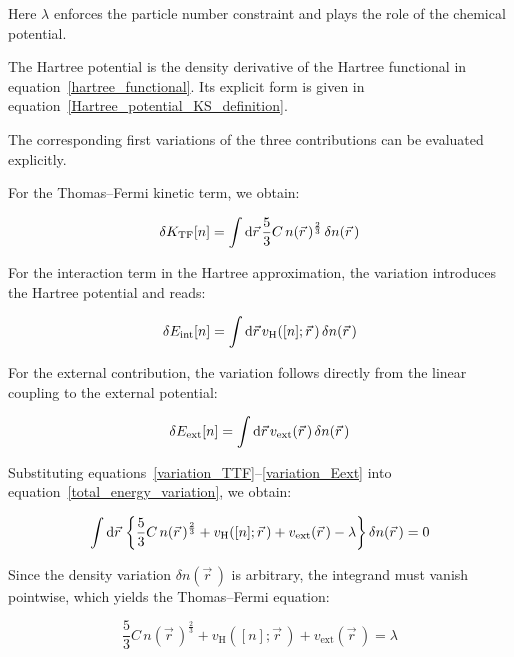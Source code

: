 Here $\lambda$ enforces the particle number constraint and plays the role of the chemical potential.

The Hartree potential is the density derivative of the Hartree functional in equation~\eqref{hartree_functional}.
Its explicit form is given in equation~\eqref{Hartree_potential_KS_definition}.

The corresponding first variations of the three contributions can be evaluated explicitly.

For the Thomas--Fermi kinetic term, we obtain:

\begin{equation}
    \delta K_\mathrm{TF}[n]
    = \int\mathrm{d}{\vec{r}}\,\frac{5}{3}C\,n(\vec{r}\,)^{\frac{2}{3}}\,\delta n(\vec{r}\,)
\label{variation_TTF}
\end{equation}

For the interaction term in the Hartree approximation, the variation introduces the Hartree potential and reads:

\begin{equation}
    \delta E_\mathrm{int}[n]
    = \int\mathrm{d}{\vec{r}}\,v_\mathrm{H}([n];\vec{r}\,)\,\delta n(\vec{r}\,)
\label{variation_Eint}
\end{equation}

For the external contribution, the variation follows directly from the linear coupling to the external potential:

\begin{equation}
    \delta E_\mathrm{ext}[n]
    = \int\mathrm{d}{\vec{r}}\,v_\mathrm{ext}(\vec{r}\,)\,\delta n(\vec{r}\,)
\label{variation_Eext}
\end{equation}

Substituting equations~\eqref{variation_TTF}--\eqref{variation_Eext} into equation~\eqref{total_energy_variation}, we obtain:

\begin{equation}
    \int\mathrm{d}{\vec{r}}\,\left\{\frac{5}{3}C\,n(\vec{r}\,)^{\frac{2}{3}}+v_\mathrm{H}([n];\vec{r}\,)+v_\mathrm{ext}(\vec{r}\,)-\lambda\right\}\delta n(\vec{r}\,)=0
\label{total_energy_minimization}
\end{equation}

Since the density variation $\delta n(\vec{r}\,)$ is arbitrary, the integrand must vanish pointwise, which yields the Thomas--Fermi equation:

\begin{equation}
    \frac{5}{3}C\,n(\vec{r}\,)^{\frac{2}{3}}+v_\mathrm{H}([n];\vec{r}\,)+v_\mathrm{ext}(\vec{r}\,)=\lambda
\label{Thomas_Fermi_equation}
\end{equation}

